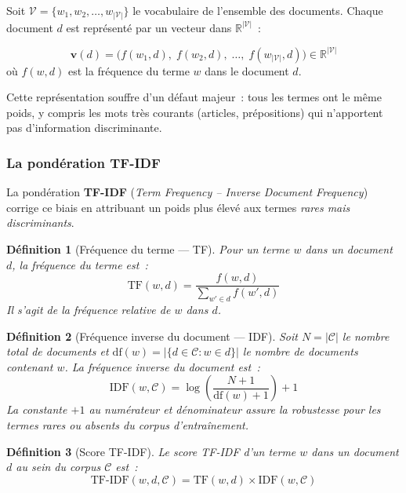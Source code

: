 \documentclass[12pt, a4paper]{article}
\newtheorem{definition}{Définition}[section]
\begin{document}
Soit $\mathcal{V} = \{w_1, w_2, \ldots, w_{|\mathcal{V}|}\}$ le vocabulaire de l'ensemble des documents. Chaque document $d$ est représenté par un vecteur dans $\mathbb{R}^{|\mathcal{V}|}$~:

\begin{mathbox}[title=Représentation Bag of Words]
\[
\mathbf{v}(d) = \bigl( f(w_1, d),\; f(w_2, d),\; \ldots,\; f(w_{|\mathcal{V}|}, d) \bigr) \in \mathbb{R}^{|\mathcal{V}|}
\]
où $f(w, d)$ est la fréquence du terme $w$ dans le document $d$.
\end{mathbox}

Cette représentation souffre d'un défaut majeur~: tous les termes ont le même poids, y compris les mots très courants (articles, prépositions) qui n'apportent pas d'information discriminante.

\subsubsection{La pondération TF-IDF}

La pondération \textbf{TF-IDF} (\textit{Term Frequency -- Inverse Document Frequency}) corrige ce biais en attribuant un poids plus élevé aux termes \textit{rares mais discriminants}.

\begin{definition}[Fréquence du terme --- TF]
Pour un terme $w$ dans un document $d$, la fréquence du terme est~:
\[
\mathrm{TF}(w, d) = \frac{f(w, d)}{\sum_{w' \in d} f(w', d)}
\]
Il s'agit de la fréquence relative de $w$ dans $d$.
\end{definition}

\begin{definition}[Fréquence inverse du document --- IDF]
Soit $N = |\mathcal{C}|$ le nombre total de documents et $\mathrm{df}(w) = |\{d \in \mathcal{C} : w \in d\}|$ le nombre de documents contenant $w$. La fréquence inverse du document est~:
\[
\mathrm{IDF}(w, \mathcal{C}) = \log\!\left(\frac{N + 1}{\mathrm{df}(w) + 1}\right) + 1
\]
La constante $+1$ au numérateur et dénominateur assure la robustesse pour les termes rares ou absents du corpus d'entraînement.
\end{definition}

\begin{definition}[Score TF-IDF]
Le score TF-IDF d'un terme $w$ dans un document $d$ au sein du corpus $\mathcal{C}$ est~:
\[
\boxed{
  \mathrm{TF\text{-}IDF}(w, d, \mathcal{C}) = \mathrm{TF}(w, d) \times \mathrm{IDF}(w, \mathcal{C})
}
\]
\end{definition}
\end{document}

